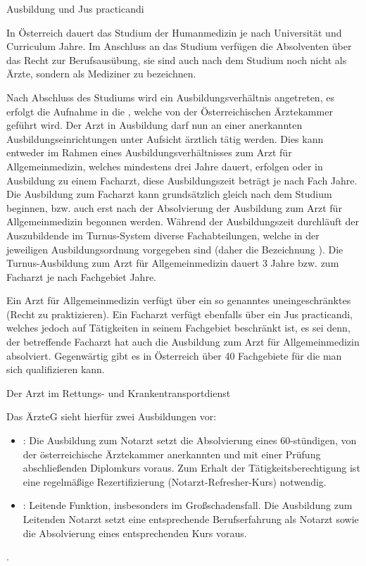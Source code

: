 \documentclass[
ngerman,
paper=a4,
asymmetric,
fontsize=10pt,
draft=false,
numbers=noenddot,
bibtotocnumbered,
footnotes=multiple,
]{scrreprt}
\newcommand{\jNEUende}{\newline{\color{green}\rule{\linewidth}{3pt}\newline}}
\begin{document}
{Ausbildung und Jus practicandi}
{In Österreich dauert das Studium der Humanmedizin je nach
 Universität und Curriculum  Jahre. Im Anschluss an das
 Studium verfügen die Absolventen  über das Recht zur
 Berufsausübung, sie sind auch nach dem
 Studium noch nicht als Ärzte, sondern als Mediziner zu
bezeichnen. 

Nach Abschluss des Studiums wird ein
 Ausbildungsverhältnis angetreten, es erfolgt die Aufnahme in
die , welche von der Österreichischen
Ärztekammer geführt wird. Der Arzt in Ausbildung darf nun an
einer anerkannten Ausbildungseinrichtungen unter 
 Aufsicht ärztlich tätig werden. Dies kann entweder im Rahmen
 eines Ausbildungsverhältnisses zum Arzt für Allgemeinmedizin,
 welches mindestens drei Jahre dauert, erfolgen oder in Ausbildung zu
 einem Facharzt, diese Ausbildungszeit beträgt je nach Fach
  Jahre. Die Ausbildung zum Facharzt kann
 grundsätzlich gleich nach dem Studium beginnen, bzw. auch erst nach der
 Absolvierung der Ausbildung zum Arzt für Allgemeinmedizin
 begonnen werden. Während der Ausbildungszeit durchläuft der
 Auszubildende  im Turnus-System diverse
 Fachabteilungen, welche in der jeweiligen Ausbildungsordnung
vorgegeben sind (daher die Bezeichnung
). Die Turnus-Ausbildung
zum Arzt für Allgemeinmedizin dauert 3 Jahre bzw. zum
Facharzt je nach Fachgebiet  Jahre. 
 
 Ein Arzt für Allgemeinmedizin verfügt über ein so genanntes
uneingeschränktes  (Recht zu
praktizieren). Ein Facharzt verfügt ebenfalls über ein Jus
practicandi, welches jedoch auf Tätigkeiten in seinem
 Fachgebiet beschränkt ist, es sei denn, der betreffende
 Facharzt hat auch die Ausbildung zum Arzt für
 Allgemeinmedizin absolviert. Gegenwärtig gibt es in
 Österreich über 40 Fachgebiete für die man sich
qualifizieren kann.}
{}
{}
{}
{}
 
{Der Arzt im Rettungs- und Krankentransportdienst}
{Das ÄrzteG sieht hierfür zwei Ausbildungen vor:
\begin{itemize}
  \item {}: Die Ausbildung zum Notarzt setzt die
  Absolvierung eines 60-stündigen, von der österreichische Ärztekammer anerkannten und mit einer
  Prüfung abschließenden Diplomkurs
  voraus.
  Zum Erhalt der
  Tätigkeitsberechtigung ist eine regelmäßige
  Rezertifizierung (Notarzt-Refresher-Kurs) notwendig.
  \item {}: Leitende Funktion, insbesonders 
  im Großschadensfall. Die Ausbildung zum Leitenden Notarzt setzt
  eine entsprechende Berufserfahrung als Notarzt sowie die   Absolvierung eines
  entsprechenden Kurs voraus.
\end{itemize}

}
{}
{}
{}
{}
.
\jNEUende
\end{document}
